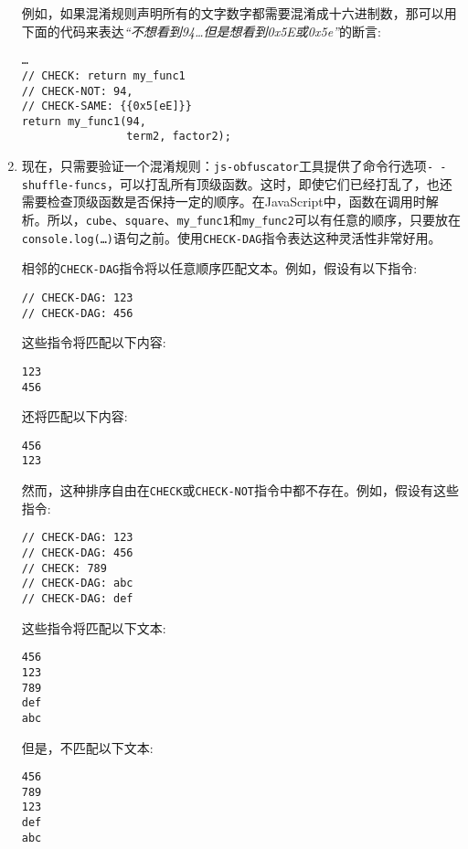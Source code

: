 \begin{enumerate}
例如，如果混淆规则声明所有的文字数字都需要混淆成十六进制数，那可以用下面的代码来表达\textit{“不想看到94…但是想看到0x5E或0x5e”}的断言:

\begin{lstlisting}[style=styleJavaScript]
…
// CHECK: return my_func1
// CHECK-NOT: 94,
// CHECK-SAME: {{0x5[eE]}}
return my_func1(94,
				term2, factor2);
\end{lstlisting}

\item 现在，只需要验证一个混淆规则：\texttt{js-obfuscator}工具提供了命令行选项\texttt{-\,-shuffle-funcs}，可以打乱所有顶级函数。这时，即使它们已经打乱了，也还需要检查顶级函数是否保持一定的顺序。在JavaScript中，函数在调用时解析。所以，\texttt{cube}、\texttt{square}、\texttt{my\_func1}和\texttt{my\_func2}可以有任意的顺序，只要放在\texttt{console.log(…)}语句之前。使用\texttt{CHECK-DAG}指令表达这种灵活性非常好用。

相邻的\texttt{CHECK-DAG}指令将以任意顺序匹配文本。例如，假设有以下指令:

\begin{lstlisting}[style=styleJavaScript]
// CHECK-DAG: 123
// CHECK-DAG: 456
\end{lstlisting}

这些指令将匹配以下内容:

\begin{lstlisting}[style=styleJavaScript]
123
456
\end{lstlisting}

还将匹配以下内容:

\begin{lstlisting}[style=styleJavaScript]
456
123
\end{lstlisting}

然而，这种排序自由在\texttt{CHECK}或\texttt{CHECK-NOT}指令中都不存在。例如，假设有这些指令:

\begin{lstlisting}[style=styleJavaScript]
// CHECK-DAG: 123
// CHECK-DAG: 456
// CHECK: 789
// CHECK-DAG: abc
// CHECK-DAG: def
\end{lstlisting}

这些指令将匹配以下文本:

\begin{lstlisting}[style=styleJavaScript]
456
123
789
def
abc
\end{lstlisting}

但是，不匹配以下文本:

\begin{lstlisting}[style=styleJavaScript]
456
789
123
def
abc
\end{lstlisting}


\end{enumerate}

